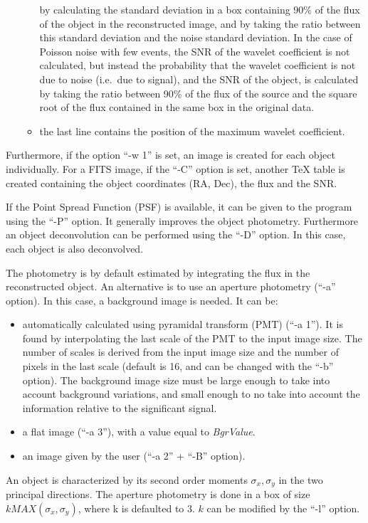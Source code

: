\begin{itemize}
\begin{itemize}
by calculating the standard deviation in a box containing 90\% of the flux of
the object in the reconstructed image, and by taking the  ratio between 
this standard deviation and 
the noise standard deviation. In the case of Poisson
noise with few events, the SNR of the wavelet coefficient is not calculated,
but instead the probability that the wavelet coefficient is not due to noise
(i.e.\ due to signal), and the SNR of the object, is calculated by
taking the ratio between  90\% of the flux of the source and the square
root of the flux contained in the same box in the original data.
\item the last line contains the position of the maximum wavelet coefficient.
\end{itemize}
\end{itemize}
Furthermore, if the option ``-w 1'' is set, an image is created for each 
object individually.
For a FITS image, if the ``-C'' option is set, another TeX table is created
containing the object coordinates (RA, Dec), the flux and the SNR.

If the Point Spread Function (PSF) is available, it can be given to the
program using the ``-P'' option. It generally improves the object photometry.
Furthermore an object deconvolution can be performed using the 
``-D'' option. In
this case, each object is also deconvolved. 

The photometry is by default estimated by integrating the flux in the
reconstructed object. An alternative is to use an 
aperture photometry (``-a'' option). In this case, a background image is needed.
It can be:
\begin{itemize}
\item automatically calculated using pyramidal transform (PMT) (``-a 1'').
It is found by interpolating
 the last scale of the PMT  to the input image size. 
 The number of scales is derived from the
 input image size and the number of pixels in the last scale (default is 16, 
 and can be changed with the ``-b'' option).
 The background image size must be large enough to take into account 
 background variations, and small enough to no take into account the 
 information relative to the significant signal.
\item  a flat image (``-a 3''), with a value equal to
{\em BgrValue}.
\item an image given by the user (``-a 2'' + ``-B'' option).
\end{itemize}
An object is characterized by its second order moments $\sigma_x,\sigma_y$ in
the two principal directions. The aperture photometry is done in a box
of size $k MAX(\sigma_x,\sigma_y)$, where k is defaulted to 3. $k$ can
be modified by the ``-l'' option.

